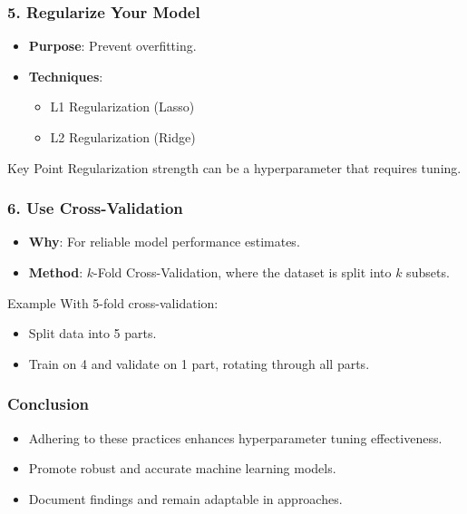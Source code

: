 \documentclass[aspectratio=169]{beamer}
\begin{document}
\begin{frame}
    \frametitle{5. Regularize Your Model}
    \begin{itemize}
        \item \textbf{Purpose}: Prevent overfitting.
        \item \textbf{Techniques}:
        \begin{itemize}
            \item L1 Regularization (Lasso)
            \item L2 Regularization (Ridge)
        \end{itemize}
    \end{itemize}
    \begin{block}{Key Point}
        Regularization strength can be a hyperparameter that requires tuning.
    \end{block}
\end{frame}

\begin{frame}
    \frametitle{6. Use Cross-Validation}
    \begin{itemize}
        \item \textbf{Why}: For reliable model performance estimates.
        \item \textbf{Method}: $k$-Fold Cross-Validation, where the dataset is split into $k$ subsets.
    \end{itemize}
    \begin{block}{Example}
        With 5-fold cross-validation:
        \begin{itemize}
            \item Split data into 5 parts.
            \item Train on 4 and validate on 1 part, rotating through all parts.
        \end{itemize}
    \end{block}
\end{frame}

\begin{frame}
    \frametitle{Conclusion}
    \begin{itemize}
        \item Adhering to these practices enhances hyperparameter tuning effectiveness.
        \item Promote robust and accurate machine learning models.
        \item Document findings and remain adaptable in approaches.
    \end{itemize}
\end{frame}
\end{document}

